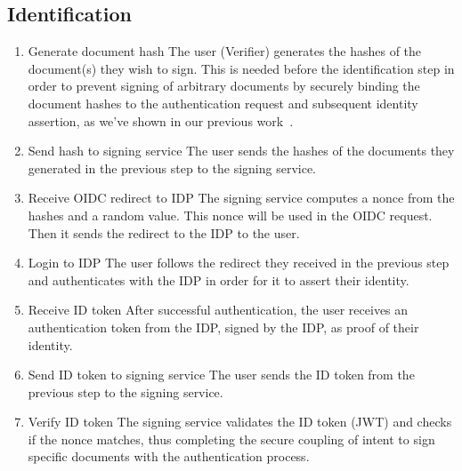 \subsection{Identification}\label{subsec:identification}
\begin{enumerate}[resume]
    \item Generate document hash
    The user (Verifier) generates the hashes of the document(s) they wish to sign.
    This is needed before the identification step in order to prevent signing of arbitrary documents by securely binding the document hashes to the authentication request and subsequent identity assertion,
    as we've shown in our previous work~\cite{projekt2}.

    \item Send hash to signing service
    The user sends the hashes of the documents they generated in the previous step to the signing service.

    \item Receive \gls{OIDC} redirect to \gls{IDP}
    The signing service computes a nonce from the hashes and a random value.
    This nonce will be used in the \gls{OIDC} request.
    Then it sends the redirect to the \gls{IDP} to the user.

    \item Login to \gls{IDP}
    The user follows the redirect they received in the previous step and authenticates with the \gls{IDP} in order for it to assert their identity.

    \item Receive ID token
    After successful authentication, the user receives an authentication token from the \gls{IDP},
    signed by the \gls{IDP}, as proof of their identity.

    \item Send ID token to signing service
    The user sends the ID token from the previous step to the signing service.

    \item Verify ID token
    The signing service validates the ID token (\gls{JWT}) and checks if the nonce matches,
    thus completing the secure coupling of intent to sign specific documents with the authentication process.
\end{enumerate}


